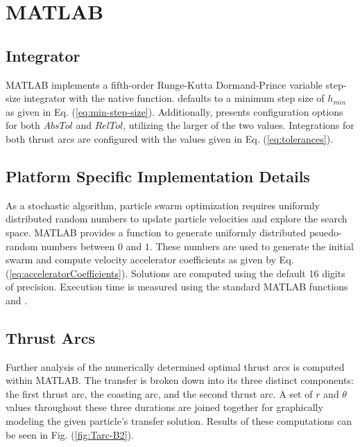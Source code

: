\section{MATLAB}

\subsection{Integrator}

\noindent MATLAB implements a fifth-order Runge-Kutta Dormand-Prince variable step-size integrator with the native  function. 
defaults to a minimum step size of $h_{min}$ as given in Eq. (\ref{eq:min-step-size}). Additionally, 
presents configuration options for both $AbsTol$ and $RelTol$, utilizing the larger of the two values.
Integrations for both thrust arcs are configured with the values given in Eq. (\ref{eq:tolerances}).

\subsection{Platform Specific Implementation Details}

\noindent As a stochastic algorithm, particle swarm optimization requires uniformly distributed random numbers to update particle velocities 
and explore the search space. MATLAB provides a  function to generate uniformly distributed
psuedo-random numbers between $0$ and $1$. These numbers are used to generate the initial swarm and compute velocity accelerator coefficients as given by Eq. (\ref{eq:acceleratorCoefficients}).
Solutions are computed using the default 16 digits of precision. Execution time is measured using the standard MATLAB
functions  and .


\subsection{Thrust Arcs}

\noindent Further analysis of the numerically determined optimal thrust arcs is computed within MATLAB.
The transfer is broken down into its three distinct components: the first thrust arc, the coasting arc, and the second thrust arc. 
A set of $r$ and $\theta$ values throughout these three durations are joined together for graphically modeling the given particle's transfer
solution. Results of these computations can be seen in Fig. (\ref{fig:Tarc-B2}). \newline

